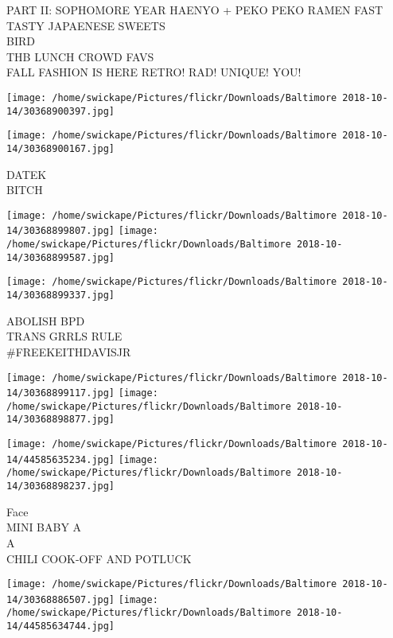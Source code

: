 \documentclass[10pt,letterpaper]{article}
\begin{document}
PART II: SOPHOMORE YEAR HAENYO + PEKO PEKO RAMEN FAST TASTY JAPAENESE SWEETS\\
BIRD\\
THB LUNCH CROWD FAVS\\
FALL FASHION IS HERE RETRO! RAD! UNIQUE! YOU!\\
\pagebreak

\texttt{[image: /home/swickape/Pictures/flickr/Downloads/Baltimore 2018-10-14/30368900397.jpg]}

\vspace{0.25in}
\texttt{[image: /home/swickape/Pictures/flickr/Downloads/Baltimore 2018-10-14/30368900167.jpg]}

DATEK\\
BITCH\\
\pagebreak

\texttt{[image: /home/swickape/Pictures/flickr/Downloads/Baltimore 2018-10-14/30368899807.jpg]}
\texttt{[image: /home/swickape/Pictures/flickr/Downloads/Baltimore 2018-10-14/30368899587.jpg]}

\vspace{0.25in}
\texttt{[image: /home/swickape/Pictures/flickr/Downloads/Baltimore 2018-10-14/30368899337.jpg]}

ABOLISH BPD\\
TRANS GRRLS RULE\\
\#FREEKEITHDAVISJR\\
\pagebreak

\texttt{[image: /home/swickape/Pictures/flickr/Downloads/Baltimore 2018-10-14/30368899117.jpg]}
\texttt{[image: /home/swickape/Pictures/flickr/Downloads/Baltimore 2018-10-14/30368898877.jpg]}

\texttt{[image: /home/swickape/Pictures/flickr/Downloads/Baltimore 2018-10-14/44585635234.jpg]}
\texttt{[image: /home/swickape/Pictures/flickr/Downloads/Baltimore 2018-10-14/30368898237.jpg]}

Face\\
MINI BABY A\\
A\\
CHILI COOK{-}OFF AND POTLUCK\\
\pagebreak

\texttt{[image: /home/swickape/Pictures/flickr/Downloads/Baltimore 2018-10-14/30368886507.jpg]}
\texttt{[image: /home/swickape/Pictures/flickr/Downloads/Baltimore 2018-10-14/44585634744.jpg]}
\end{document}
